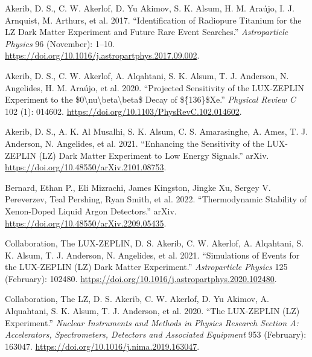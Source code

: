 \documentclass[
  10pt,
  letterpaper,
  DIV=11,
  numbers=noendperiod]{scrartcl}
\newlength{\cslhangindent}
\newlength{\cslentryspacingunit} %
\newenvironment{CSLReferences}[2] %
 {%
  \setlength{\parindent}{0pt}
  \ifodd #1
  \let\oldpar\par
  \def\par{\hangindent=\cslhangindent\oldpar}
  \fi
  \setlength{\parskip}{#2\cslentryspacingunit}
 }%
 {}
\begin{document}
\begin{CSLReferences}{1}{0}
\leavevmode{}%
Akerib, D. S., C. W. Akerlof, D. Yu Akimov, S. K. Alsum, H. M. Araújo,
I. J. Arnquist, M. Arthurs, et al. 2017. {``Identification of {Radiopure
Titanium} for the {LZ Dark Matter Experiment} and {Future Rare Event
Searches}.''} \emph{Astroparticle Physics} 96 (November): 1--10.
\url{https://doi.org/10.1016/j.astropartphys.2017.09.002}.

\leavevmode{}%
Akerib, D. S., C. W. Akerlof, A. Alqahtani, S. K. Alsum, T. J. Anderson,
N. Angelides, H. M. Araújo, et al. 2020. {``Projected Sensitivity of the
{LUX-ZEPLIN} Experiment to the
\$0\textbackslash nu\textbackslash beta\textbackslash beta\$ Decay of
\$\{̂136\}\${Xe}.''} \emph{Physical Review C} 102 (1): 014602.
\url{https://doi.org/10.1103/PhysRevC.102.014602}.

\leavevmode{}%
Akerib, D. S., A. K. Al Musalhi, S. K. Alsum, C. S. Amarasinghe, A.
Ames, T. J. Anderson, N. Angelides, et al. 2021. {``Enhancing the
Sensitivity of the {LUX-ZEPLIN} ({LZ}) Dark Matter Experiment to Low
Energy Signals.''} {arXiv}.
\url{https://doi.org/10.48550/arXiv.2101.08753}.

\leavevmode{}%
Bernard, Ethan P., Eli Mizrachi, James Kingston, Jingke Xu, Sergey V.
Pereverzev, Teal Pershing, Ryan Smith, et al. 2022. {``Thermodynamic
{Stability} of {Xenon-Doped Liquid Argon Detectors}.''} {arXiv}.
\url{https://doi.org/10.48550/arXiv.2209.05435}.

\leavevmode{}%
Collaboration, The LUX-ZEPLIN, D. S. Akerib, C. W. Akerlof, A.
Alqahtani, S. K. Alsum, T. J. Anderson, N. Angelides, et al. 2021.
{``Simulations of {Events} for the {LUX-ZEPLIN} ({LZ}) {Dark Matter
Experiment}.''} \emph{Astroparticle Physics} 125 (February): 102480.
\url{https://doi.org/10.1016/j.astropartphys.2020.102480}.

\leavevmode{}%
Collaboration, The LZ, D. S. Akerib, C. W. Akerlof, D. Yu Akimov, A.
Alquahtani, S. K. Alsum, T. J. Anderson, et al. 2020. {``The
{LUX-ZEPLIN} ({LZ}) {Experiment}.''} \emph{Nuclear Instruments and
Methods in Physics Research Section A: Accelerators, Spectrometers,
Detectors and Associated Equipment} 953 (February): 163047.
\url{https://doi.org/10.1016/j.nima.2019.163047}.


\end{CSLReferences}
\end{document}
